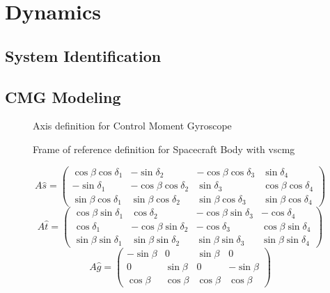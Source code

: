 \section{Dynamics}
\subsection{System Identification}
\subsection{CMG Modeling}


\begin{figure}[!h]
    \centering
    
    \caption{Axis definition for Control Moment Gyroscope}
    \label{fig:tikCMG}
\end{figure}

\begin{figure}[!h]
    \centering
    
    \caption{Frame of reference definition for Spacecraft Body with \acrfull{vscmg}}
    \label{fig:tikCMG}
\end{figure}
\usetikzlibrary{shapes}


\begin{equation*}
A\hat{s} =
\begin{pmatrix}
\cos{\beta} \cos{\delta_1} & -\sin{\delta_2} & -\cos{\beta} \cos{\delta_3} &  \sin{\delta_4} \\
-\sin{\delta_1} & -\cos{\beta} \cos{\delta_2} &  \sin{\delta_3} &  \cos{\beta} \cos{\delta_4} \\
\sin{\beta} \cos{\delta_1} &  \sin{\beta} \cos{\delta_2} &  \sin{\beta} \cos{\delta_3} &  \sin{\beta} \cos{\delta_4} 
\end{pmatrix}
\end{equation*}
\begin{equation*}
A\hat{t} =
\begin{pmatrix}
\cos{\beta} \sin{\delta_1} &         \cos{\delta_2} & -\cos{\beta} \sin{\delta_3} &       -\cos{\delta_4} \\
       \cos{\delta_1} & -\cos{\beta} \sin{\delta_2} &        -\cos{\delta_3} & \cos{\beta} \sin{\delta_4} \\
\sin{\beta} \sin{\delta_1} &  \sin{\beta} \sin{\delta_2} &  \sin{\beta} \sin{\delta_3} & \sin{\beta} \sin{\delta_4}

\end{pmatrix}
\end{equation*}
\begin{equation*}
A\hat{g} = 
\begin{pmatrix}
 -\sin{}\beta &      0 & \sin{\beta} &       0 \\
       0 & \sin{\beta} &      0 & -\sin{\beta} \\
  \cos{\beta} & \cos{\beta} & \cos{\beta} &  \cos{\beta}
\end{pmatrix}
\end{equation*}



